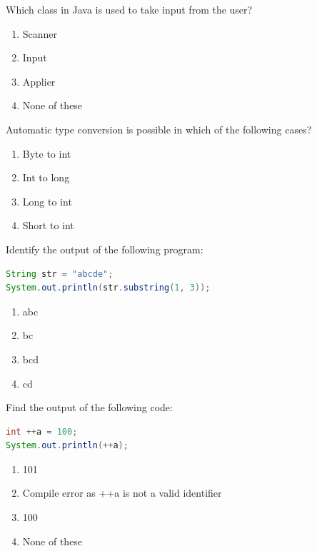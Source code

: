 \documentclass[11pt,a4paper]{article}
\begin{document}
\begin{parts}
  \item Which class in Java is used to take input from the user?
  
\begin{enumerate}[label=(\alph*),itemsep=2pt]
    \item Scanner
    \item Input
    \item Applier
    \item None of these
  \end{enumerate}
  
  \item Automatic type conversion is possible in which of the following cases?
  
\begin{enumerate}[label=(\alph*),itemsep=2pt]
    \item Byte to int
    \item Int to long
    \item Long to int
    \item Short to int
  \end{enumerate}
  
  \item Identify the output of the following program:

\begin{lstlisting}[language=Java]
String str = "abcde";
System.out.println(str.substring(1, 3));
\end{lstlisting}
  
\begin{enumerate}[label=(\alph*),itemsep=2pt]
    \item abc
    \item bc
    \item bcd
    \item cd
  \end{enumerate}
  
  \item Find the output of the following code:

\begin{lstlisting}[language=Java]
int ++a = 100;
System.out.println(++a);
\end{lstlisting}
  
\begin{enumerate}[label=(\alph*),itemsep=2pt]
    \item 101
    \item Compile error as ++a is not a valid identifier
    \item 100
    \item None of these
  \end{enumerate}
  

\end{parts}
\end{document}
